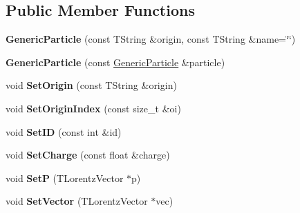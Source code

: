 \subsection*{Public Member Functions}
\begin{DoxyCompactItemize}
\item 
\hypertarget{class_h_a_l_1_1_generic_particle_a3efe0e487f7fe9e779321363eb9dde35}{{\bfseries Generic\-Particle} (const T\-String \&origin, const T\-String \&name=\char`\"{}\char`\"{})}\label{class_h_a_l_1_1_generic_particle_a3efe0e487f7fe9e779321363eb9dde35}

\item 
\hypertarget{class_h_a_l_1_1_generic_particle_a1e9e01f96e31e980b2c31af42bb1c514}{{\bfseries Generic\-Particle} (const \hyperlink{class_h_a_l_1_1_generic_particle}{Generic\-Particle} \&particle)}\label{class_h_a_l_1_1_generic_particle_a1e9e01f96e31e980b2c31af42bb1c514}

\item 
\hypertarget{class_h_a_l_1_1_generic_particle_a91b82bc5204850ab0d40163ed103ee12}{void {\bfseries Set\-Origin} (const T\-String \&origin)}\label{class_h_a_l_1_1_generic_particle_a91b82bc5204850ab0d40163ed103ee12}

\item 
\hypertarget{class_h_a_l_1_1_generic_particle_a81d7aa1fd86d8f1d7e78286f32840e90}{void {\bfseries Set\-Origin\-Index} (const size\-\_\-t \&oi)}\label{class_h_a_l_1_1_generic_particle_a81d7aa1fd86d8f1d7e78286f32840e90}

\item 
\hypertarget{class_h_a_l_1_1_generic_particle_aa125325fe47360c75036732b90ca2c5b}{void {\bfseries Set\-I\-D} (const int \&id)}\label{class_h_a_l_1_1_generic_particle_aa125325fe47360c75036732b90ca2c5b}

\item 
\hypertarget{class_h_a_l_1_1_generic_particle_a06e76eefefa12e67947c8e3cfd0ab401}{void {\bfseries Set\-Charge} (const float \&charge)}\label{class_h_a_l_1_1_generic_particle_a06e76eefefa12e67947c8e3cfd0ab401}

\item 
\hypertarget{class_h_a_l_1_1_generic_particle_a985b92b525a1b6c2199b3c797dae153d}{void {\bfseries Set\-P} (T\-Lorentz\-Vector $\ast$p)}\label{class_h_a_l_1_1_generic_particle_a985b92b525a1b6c2199b3c797dae153d}

\item 
\hypertarget{class_h_a_l_1_1_generic_particle_a29a1b6d060a5bd6d4a2d5b638629016e}{void {\bfseries Set\-Vector} (T\-Lorentz\-Vector $\ast$vec)}\label{class_h_a_l_1_1_generic_particle_a29a1b6d060a5bd6d4a2d5b638629016e}


\end{DoxyCompactItemize}
